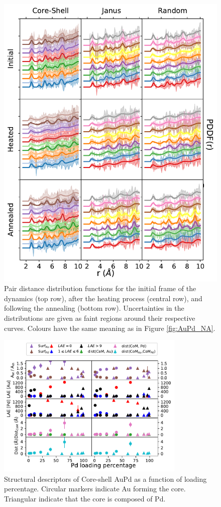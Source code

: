 \begin{figure}
    \centering
    \includegraphics{figures/MD/Alloys/Melt_Au-Pd.pdf}
    \caption{Pair distance distribution functions for the initial frame of the dynamics (top row), after the heating process (central row), and following the annealing (bottom row). Uncertainties in the distributions are given as faint regions around their respective curves. Colours have the same meaning as in Figure \ref{fig:AuPd_NA}. }
    \label{fig:AuPd_PDF}
\end{figure}

\begin{figure}
    \centering
    \includegraphics[width=0.8\textwidth]{figures/MD/Alloys/Core-Shell_Au-Pd.pdf}
    \caption{Structural descriptors of Core-shell AuPd as a function of loading percentage. Circular markers indicate Au forming the core. Triangular indicate that the core is composed of Pd.}
    \label{fig:AuPdCS_Dyn}
\end{figure}

